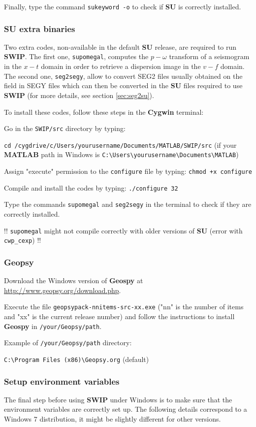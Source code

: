 \documentclass[twoside,a4paper]{article}
\def\SWIP{\textbf{SWIP}}
\def\SU{\textbf{SU}}
\def\Geopsy{\textbf{Geospy}}
\def\MATLAB{\textbf{MATLAB}}
\def\Cygwin{\textbf{Cygwin}}
\begin{document}
Finally, type the command \verb|sukeyword -o| to check if {\SU} is correctly installed.

\subsubsection{SU extra binaries}
Two extra codes, non-available in the default {\SU} release, are required to run {\SWIP}. The first one, \verb|supomegal|, computes the $p-\omega$ transform of a seismogram in the $x-t$ domain in order to retrieve a dispersion image in the $v-f$ domain. The second one, \verb|seg2segy|, allow to convert SEG2 files usually obtained on the field in SEGY files which can then be converted in the {\SU} files required to use {\SWIP} (for more details, see section \ref{sec:seg2su}).

To install these codes, follow these steps in the {\Cygwin} terminal:

Go in the \verb|SWIP/src| directory by typing: 

\verb|cd /cygdrive/c/Users/yourusername/Documents/MATLAB/SWIP/src| (if your {\MATLAB} path in Windows is \verb|C:\Users\yourusername\Documents\MATLAB|)

Assign "execute" permission to the \verb|configure| file by typing: \verb|chmod +x configure|

Compile and install the codes by typing: \verb|./configure 32|

Type the commands \verb|supomegal| and \verb|seg2segy| in the terminal to check if they are correctly installed.

!! \verb|supomegal| might not compile correctly with older versions of {\SU} (error with \verb|cwp_cexp|) !!

\subsubsection{Geopsy}
Download the Windows version of {\Geopsy} at \url{http://www.geopsy.org/download.php}.

Execute the file \verb|geopsypack-nnitems-src-xx.exe| ("nn" is the number of items and "xx" is the current release number) and follow the instructions to install {\Geopsy} in \verb|/your/Geopsy/path|.

Example of \verb|/your/Geopsy/path| directory:

\verb|C:\Program Files (x86)\Geopsy.org| (default)

\subsubsection{Setup environment variables}
The final step before using {\SWIP} under Windows is to make sure that the environment variables are correctly set up. The following details correspond to a Windows 7 distribution, it might be slightly different for other versions.
\end{document}
